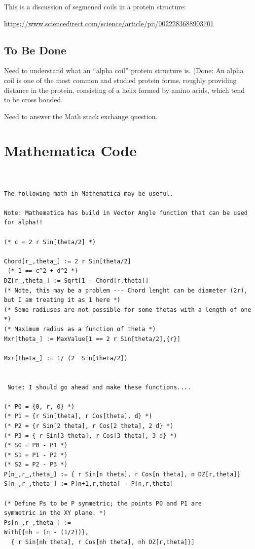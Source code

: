 \documentclass[11pt]{article}
\begin{document}
{This is a discussion of segmened coils in a protein structure:

\url{https://www.sciencedirect.com/science/article/pii/0022283688903701}

\subsection{To Be Done}

Need to understand what an ``alpha coil'' protein structure is. (Done: An alpha coil is one of the most common
and studied protein forms, roughly providing distance in the protein, consisting of a helix formed by
amino acids, which tend to be cross bonded.

Need to answer the Math stack  exchange question.




\appendix

\section{Mathematica Code}

\begin{verbatim}


The following math in Mathematica may be useful.

Note: Mathematica has build in Vector Angle function that can be used for alpha!!

(* c = 2 r Sin[theta/2] *)

Chord[r_,theta_] := 2 r Sin[theta/2]
 (* 1 == c^2 + d^2 *)
DZ[r_,theta_] := Sqrt[1 - Chord[r,theta]]
(* Note, this may be a problem --- Chord lenght can be diameter (2r), but I am treating it as 1 here *)
(* Some radiuses are not possible for some thetas with a length of one *)
(* Maximum radius as a function of theta *)
Mxr[theta_] := MaxValue[1 == 2 r Sin[theta/2],{r}]

Mxr[theta_] := 1/ (2  Sin[theta/2])


 Note: I should go ahead and make these functions....

(* P0 = {0, r, 0} *)
(* P1 = {r Sin[theta], r Cos[theta], d} *)
(* P2 = {r Sin[2 theta], r Cos[2 theta], 2 d} *)
(* P3 = { r Sin[3 theta], r Cos[3 theta], 3 d} *)
(* S0 = P0 - P1 *)
(* S1 = P1 - P2 *)
(* S2 = P2 - P3 *)
P[n_,r_,theta_] := { r Sin[n theta], r Cos[n theta], n DZ[r,theta]}
S[n_,r_,theta_] := P[n+1,r,theta] - P[n,r,theta]

(* Define Ps to be P symmetric; the points P0 and P1 are
symmetric in the XY plane. *)
Ps[n_,r_,theta_] :=
With[{nh = (n - (1/2))},
  { r Sin[nh theta], r Cos[nh theta], nh DZ[r,theta]}]



\end{verbatim}}
\end{document}
